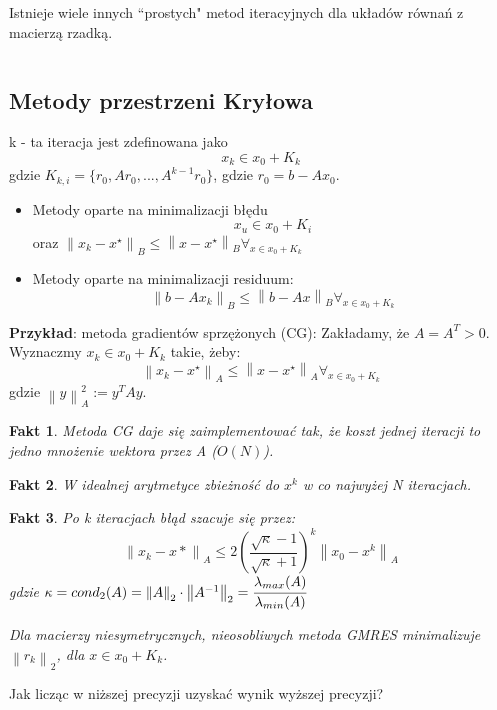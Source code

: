 \documentclass[hidelinks,a4paper,fleqn,oneside]{book}
\newcommand{\norm}[1]{\left\lVert#1\right\rVert}
\newtheorem{fakt}{Fakt}
\begin{document}
Istnieje wiele innych ``prostych" metod iteracyjnych dla układów równań z macierzą rzadką.

$\quad$ 

\subsection{Metody przestrzeni Kryłowa}
k - ta iteracja jest zdefinowana jako
\[
	x_k \in x_0 + K_k
\]
gdzie $K_{k, i} = \{r_0, Ar_0, ..., A^{k-1}r_0\}$, gdzie $r_0 = b - Ax_0$.

\begin{itemize}
	\item Metody oparte na minimalizacji błędu
	      \[
	      	x_u \in x_0 + K_i
	      \]
	      oraz $\norm{x_k - x^\star}_B \leq \norm{x - x^\star}_B \forall_{x \in x_0 + K_k}$ 
	\item Metody oparte na minimalizacji residuum:
	      \[
	      	\norm{b - Ax_k}_B \leq \norm{b - Ax}_B \forall_{x \in x_0 + K_k}
	      \]
\end{itemize}
	
\textbf{Przykład}: metoda gradientów sprzężonych (CG):
Zakładamy, że $A = A^T > 0$. Wyznaczmy $x_k \in x_0 + K_k$ takie, żeby:
\[
	\norm{x_k - x^\star}_A \leq \norm{x - x^\star}_A \forall_{x \in x_0 + K_k}
\]
gdzie $\norm{y}_A^2 := y^T A y$.	
	
\begin{fakt} Metoda CG daje się zaimplementować tak, że koszt jednej iteracji to jedno mnożenie wektora przez A ($O(N)$).
\end{fakt}	

\begin{fakt} W idealnej arytmetyce zbieżność do $x^k$ w co najwyżej N iteracjach.
\end{fakt}	

\begin{fakt} Po k iteracjach błąd szacuje się przez:
	\[
		\norm{x_k - x*} _A \leq 2 \left(\frac{\sqrt{\kappa} - 1}{\sqrt{\kappa} + 1}\right)^k \norm{x_0 - x^k}_A
	\]
	gdzie $\kappa = cond_2(A) = \norm{A} _2 \cdot \norm{A^{-1}}_2 = \cfrac{\lambda_{max}(A)}{\lambda_{min}(A)}$
	
	Dla macierzy niesymetrycznych, nieosobliwych metoda GMRES minimalizuje $\norm{r_k}_2$, dla $x \in x_0 + K_k$.
\end{fakt}

Jak licząc w niższej precyzji uzyskać wynik wyższej precyzji?
\end{document}
